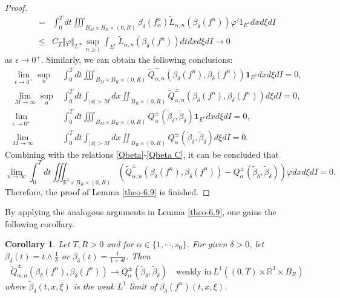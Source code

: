 \documentclass[reqno,11pt]{amsart}
\newtheorem{corollary}{Corollary}[section]
\numberwithin{equation}{section}
\def\no{\nonumber}
\def\R{\mathbb{R}}
\begin{document}
\begin{proof}
\begin{equation}
{\begin{aligned}
			=& \int_{0}^{T} dt \iiint_{B_M \times B_R \times(0,R)} \beta_\delta (f^n_\alpha) \tilde{L}_{\alpha ,n} (\beta_\delta (f^n)) \varphi ' 1_{E^c} dxd\xi dI \\
			\leq &C_T \Vert \varphi \Vert_{L^\infty} \sup_{n \geq 1} \int_{E^c} \tilde{L}_{\alpha ,n} (\beta_\delta (f^n)) dtdxd\xi dI \rightarrow  0
		\end{aligned}}
	\end{equation}
as $\epsilon \rightarrow 0^+.$ Similarly, we can obtain the following conclusions:
{\small
		\begin{align}\label{Qbeta C}
			\no \lim\limits_{\epsilon \rightarrow 0^+} \sup  \limits_{n}&\int_{0}^{T} dt \iiint_{B_M \times B_R \times(0,R)} \tilde{Q}^-_{\alpha ,n} (\beta_\delta(f^n),\beta_\delta (f^n))  \mathbf{1}_{E^c} dxd\xi dI = 0 ,\\
			\no \lim\limits_{M \rightarrow \infty}\sup  \limits_{n} &\int_{0}^{T} dt \int_{|x|>M} dx \iint_{B_R \times (0,R)} \tilde{Q}^\pm_{\alpha ,n} (\beta_\delta(f^n),\beta_\delta (f^n))d\xi dI = 0,\\
			\no \lim\limits_{\epsilon \rightarrow 0^+}&\int_{0}^{T} dt \iiint_{B_M \times B_R \times(0,R)} Q^\pm _\alpha (\tilde{\beta }_\delta,\tilde{\beta }_\delta) \mathbf{1}_{E^c} dxd\xi dI = 0, \\
			\lim\limits_{M \rightarrow \infty} &\int_{0}^{T} dt \int_{|x|>M} dx \iint_{B_R \times (0,R)}  Q^\pm _\alpha (\tilde{\beta }_\delta,\tilde{\beta }_\delta)d\xi dI = 0.
		\end{align}}
	Combining with the relations \eqref{Qbeta}-\eqref{Qbeta C}, it can be concluded that 
	\begin{equation}
		\lim\limits_{n \rightarrow \infty}	\int_{0}^{T} dt \iiint_{\R^3 \times B_R \times (0,R)} ( \tilde{Q}^\pm_{\alpha ,n} (\beta_\delta(f^n),\beta_\delta (f^n))-Q^\pm _\alpha (\tilde{\beta }_\delta,\tilde{\beta }_\delta))\varphi dxd\xi dI =0.
	\end{equation}
	Therefore, the proof of Lemma \ref{theo-6.9} is finished.
\end{proof}

By applying the analogous arguments in Lemma \ref{theo-6.9}, one gains the following corollary.

\begin{corollary}\label{cor6.9}
	Let $T, R > 0$ and for $\alpha \in \{1,\cdots,s_0\}$. For given $\delta >0$, let $\beta_\delta (t)=t\wedge \frac{1}{\delta}$ or $\beta_\delta (t)=\frac{t}{1+\delta t}$. Then 
	\begin{equation*}
		\tilde{Q}^\pm_{\alpha ,n} (\beta_\delta(f^n),\beta_\delta(f^n)) \to Q^\pm _\alpha (\tilde{\beta }_\delta,\tilde{\beta }_\delta) \quad \text{weakly in} \ L^1((0,T)\times \R^3 \times B_R)
	\end{equation*}
	where $\tilde{\beta}_\delta (t, x, \xi)$ is the weak $L^1$ limit of $\beta_\delta(f^n) (t, x, \xi)$.
\end{corollary}
\end{document}
